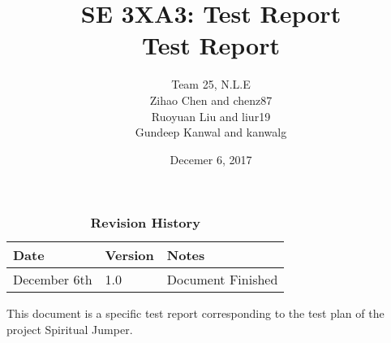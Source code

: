 \documentclass[12pt, titlepage]{article}
\title{SE 3XA3: Test Report\\Test Report}
\author{Team 25, N.L.E
		\\ Zihao Chen and chenz87
		\\ Ruoyuan Liu and liur19
		\\ Gundeep Kanwal and kanwalg
}
\date{Decemer 6, 2017}
\begin{document}
\maketitle

\tableofcontents
\listoftables
\listoffigures

\begin{table}[bp]
\caption{\bf Revision History}
\begin{tabularx}{\textwidth}{p{3cm}p{2cm}X}
\toprule {\bf Date} & {\bf Version} & {\bf Notes}\\
\midrule
December 6th & 1.0 & Document Finished\\
\bottomrule
\end{tabularx}
\end{table}

\newpage


This document is a specific test report corresponding to the test plan of the project Spiritual Jumper.
\end{document}
